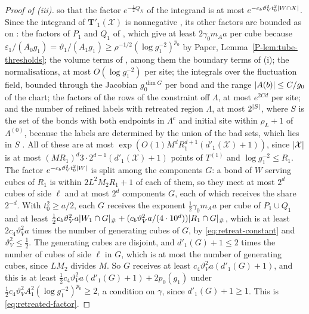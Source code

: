 \documentclass[11pt]{preprint}
\DeclarePairedDelimiter{\abs}{\lvert}{\rvert}
\numberwithin{equation}{section}
\theoremstyle{definition}
\theoremstyle{remark}
\theoremstyle{plain}
\begin{document}
\begin{proof}[Proof of (iii)]
so that the factor $e^{-\frac12Q_X}$ of the integrand is at most $e^{-c_b\vartheta_V^2t_0^2\abs{W \cap X}}$. Since the integrand of $\mathbf T'_1(\mathcal X)$ is nonnegative \cite[(1.73), p.~380]{BalabanLFR2}, its other factors are bounded as on \cite[pp.~380--383]{BalabanLFR2}: the factors of $P_1$ and $Q_1$ of \cite[p.~380]{BalabanLFR2}, which give at least $2\gamma_0m_Aa$ per cube because $\varepsilon_1/(A_0g_1) = \vartheta_1/(A_1g_1) \geq \rho^{-1/2}(\log g_1^{-2})^{p_0}$ by Paper, Lemma~\ref{P-lem:tube-thresholds}; the volume terms of \cite[p.~380, l.~25--29]{BalabanLFR2}, among them the boundary terms of (i); the normalisations, at most $O(\log g_1^{-2})$ per site; the integrals over the fluctuation field, bounded through the Jacobian $g_0^{\dim G}$ per bond and the range $\abs{A(b)} \leq C/g_0$ of the chart; the factors of the rows of the constraint off $\Lambda$, at most $e^{2Cd}$ per site; and the number of refined labels with retreated region $\Lambda$, at most $2^{\abs{S}}$, where $S$ is the set of the bonds with both endpoints in $\Lambda^c$ and initial site within $\rho_L + 1$ of $\Lambda^{(0)}$, because the labels are determined by the union of the bad sets, which lies in $S$ \cite[Lemma~9.12]{WilsonFirstStep}. All of these are at most $\exp(O(1)M^dR_1^{d+1}(d'_1(\mathcal X) + 1))$, since $\abs{\mathcal X}$ is at most $(MR_1)^d3 \cdot 2^{d-1}(d'_1(\mathcal X) + 1)$ points of $T^{(1)}$ and $\log g_1^{-2} \leq R_1$. The factor $e^{-c_b\vartheta_V^2t_0^2\abs{W}}$ is split among the components $G$: a bond of $W$ serving cubes of $R_1$ is within $2L^2M_2R_1 + 1$ of each of them, so they meet at most $2^d$ cubes of side $\ell$ and at most $2^d$ components $G$, each of which receives the share $2^{-d}$. With $t_0^2 \geq a/2$, each $G$ receives the exponent $\frac12\gamma_0m_Aa$ per cube of $P_1 \cup Q_1$ and at least $\frac12c_b\vartheta_V^2a\abs{W_1 \cap G}_\# + (c_b\vartheta_V^2a/(4 \cdot 10^d))\abs{R_1 \cap G}_\#$, which is at least $2c_4\vartheta_V^2a$ times the number of generating cubes of $G$, by \eqref{eq:retreat-constant} and $\vartheta_V^2 \leq \frac12$. The generating cubes are disjoint, and $d'_1(G) + 1 \leq 2$ times the number of cubes of side $\ell$ in $G$, which is at most the number of generating cubes, since $LM_2$ divides $M$. So $G$ receives at least $c_4\vartheta_V^2a(d'_1(G) + 1)$, and this is at least $\frac12c_4\vartheta_V^2a(d'_1(G) + 1) + 2p_0(g_1)$ under $\frac12c_4\vartheta_V^2A_1^2(\log g_1^{-2})^{p_0} \geq 2$, a condition on $\gamma$, since $d'_1(G) + 1 \geq 1$. This is \eqref{eq:retreated-factor}.


\end{proof}
\end{document}
